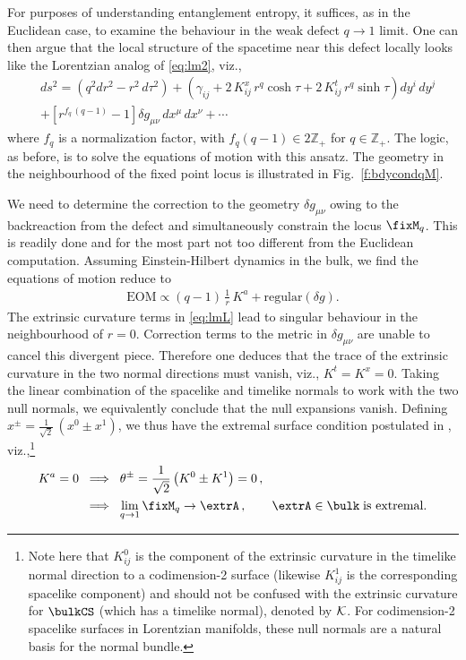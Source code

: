 \documentclass[12pt,openany]{book}
\begin{document}
For purposes of understanding entanglement entropy, it suffices, as in the Euclidean case, to examine the behaviour in the weak defect $q\to 1$ limit. One can then argue that the local structure of the spacetime near this defect locally looks like the Lorentzian analog of \eqref{eq:lm2}, viz.,
%
\begin{align}
& ds^2 = \left(q^2 dr ^2-r ^2 \, d\tau^2\right)+
        \left(\gamma_{i j}+2\, K_{ i j}^x \,r^q
        \cosh \tau+2\, K_{ i j}^t \,r^q
        \sinh \tau\right) dy^i \, dy^j \nonumber \\& +\left[r^{f_q\,(q-1)}-1\right]
         \delta g_{\mu\nu} \, dx^\mu\, dx^\nu +\cdots
\label{eq:lmL}
\end{align}
%
where $f_q$ is a normalization factor, with $f_q (q-1) \in 2 {\mathbb Z}_+$ for $q\in {\mathbb Z}_+$. The logic, as before, is to solve the equations of motion with this ansatz. The geometry in the neighbourhood of the fixed point locus is illustrated in Fig.~\ref{f:bdycondqM}.

We need to determine the correction to the geometry $\delta g_{\mu\nu}$ owing to the backreaction from the defect and simultaneously constrain the locus $\fixM_q$. This is readily done and for the most part not too different from the Euclidean computation. Assuming Einstein-Hilbert dynamics in the bulk, we find the equations of motion reduce to
%
\begin{align}
\text{EOM} \propto (q-1) \, \frac{1}{r} \, K^a  + \text{regular}\left(\delta g\right).
\label{eq:eomL}
\end{align}
%
The extrinsic curvature terms in \eqref{eq:lmL} lead to singular behaviour in the neighbourhood of $r =0$. Correction terms to the metric in  $\delta g_{\mu\nu}$ are unable to cancel this divergent piece. Therefore one deduces  that the trace of the extrinsic curvature in the  two normal directions must vanish, viz., $K^t = K^x =0$.
Taking the linear combination of the  spacelike and timelike normals to work with the two null normals, we equivalently conclude that the  null expansions  vanish. Defining $x^\pm = \frac{1}{\sqrt{2}}\, \left(x^0 \pm x^1\right)$, we thus have the extremal surface condition postulated in \cite{Hubeny:2007xt}, viz.,\footnote{ Note here that $K^0_{ij}$ is the component of the extrinsic curvature in the timelike normal direction to a codimension-2 surface (likewise $K^1_{ij}$ is the corresponding spacelike component) and should not be confused with the extrinsic curvature for $\bulkCS$ (which has a timelike normal), denoted by ${\cal K}$.  For codimension-2 spacelike surfaces in  Lorentzian manifolds, these null normals are a natural basis for the normal bundle.}
%
\begin{equation}
\begin{split}
K^a =0 & \;\; \Longrightarrow \;\; \theta^\pm = \frac{1}{\sqrt{2}} \left(K^0 \pm K^1\right) = 0 \,, \\
& \;\; \Longrightarrow \;\;  \lim_{q\to 1} \fixM_q \to \extrA \,, \qquad \extrA \in \bulk \;\text{is extremal}.
\end{split}
\label{eq:extremalEom}
\end{equation}
%
\end{document}
